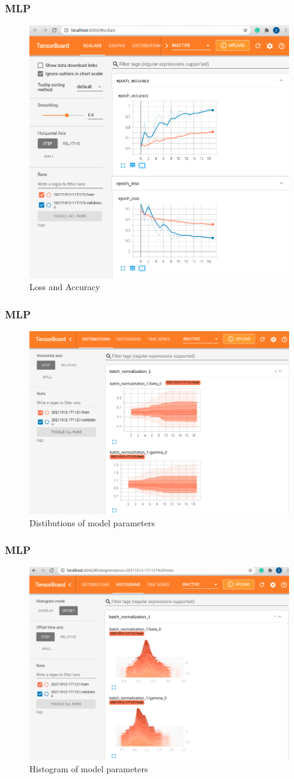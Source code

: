 \documentclass{beamer}
\begin{document}
\begin{frame}
	\frametitle{MLP}
	\begin{center}
		\begin{figure}
        \includegraphics[width=0.6\linewidth]{./src/figures/10_1.png}
        \caption{Loss and Accuracy}
		\end{figure}
	\end{center}
\end{frame}

\begin{frame}
	\frametitle{MLP}
	\begin{center}
		\begin{figure}
        \includegraphics[width=0.8\linewidth]{./src/figures/10_3.png}
        \caption{Distibutions of model parameters}
		\end{figure}
	\end{center}
\end{frame}

\begin{frame}
	\frametitle{MLP}
	\begin{center}
		\begin{figure}
        \includegraphics[width=0.8\linewidth]{./src/figures/10_4.png}
        \caption{Histogram of model parameters}
		\end{figure}
	\end{center}
\end{frame}
\end{document}

